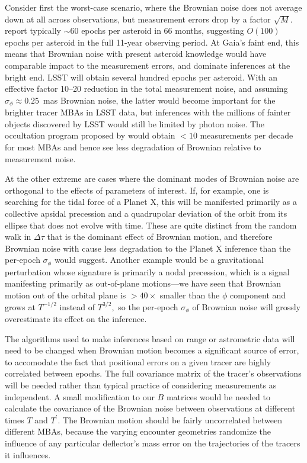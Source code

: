 \documentclass[linenumbers, onecolumn]{aastex631}
\newcommand{\matB}{B}
\begin{document}
Consider first the worst-case scenario, where the Brownian noise does
not average down at all across observations, but measurement errors
drop by a factor $\sqrt{M}.$   \citet{gaiafpr} report typically $\sim60$ epochs per asteroid in 66 months, suggesting $O(100)$ epochs per asteroid in the full 11-year observing period.  At Gaia's faint end, this means that Brownian noise with present asteroid knowledge would have comparable impact to the measurement errors, and dominate inferences at the bright end.  LSST will obtain several hundred epochs per asteroid.  With an effective factor 10--20 reduction in the total measurement noise, and assuming $\sigma_\phi\approx0.25$~mas Brownian noise, the latter would become important for the brighter tracer MBAs in LSST data, but inferences with the millions of fainter objects discovered by LSST would still be limited by photon noise.  The occultation program proposed by \citet{occultations} would obtain $<10$ measurements per decade for most MBAs and hence see less degradation of Brownian relative to measurement noise.

At the other extreme are cases where the dominant modes of Brownian noise are orthogonal to the effects of parameters of interest.  
If, for example, one is searching for the tidal force of a Planet X, this will be manifested primarily as a collective apsidal precession and a quadrupolar deviation of the orbit from its ellipse that does not evolve with time.  These are quite distinct from the random walk in $\Delta\tau$ that is the dominant effect of Brownian motion, and therefore Brownian noise with cause less degradation to the Planet X inference than the per-epoch $\sigma_\phi$ would suggest.  Another example would be a gravitational perturbation whose signature is primarily a nodal precession, which is a signal manifesting primarily as out-of-plane motions---we have seen that Brownian motion out of the orbital plane is $>40\times$ smaller than the $\phi$ component and grows at $T^{-1/2}$ instead of $T^{3/2},$ so the per-epoch $\sigma_\phi$ of Brownian noise will grossly overestimate its effect on the inference.

The algorithms used to make inferences based on range or astrometric
data will need to be changed when Brownian motion becomes a
significant source of error, to accomodate the fact that positional
errors on a given tracer are highly correlated between epochs.  The
full covariance matrix of the tracer's observations will be needed
rather than typical practice of considering measurements as
independent.  A small modification to our $\matB$ matrices would be
needed to calculate the covariance of the Brownian noise between
observations at different times $T$ and $T^\prime.$  The Brownian
motion should be fairly uncorrelated between different MBAs, because
the varying encounter geometries randomize the influence of any
particular deflector's mass error on the trajectories of the tracers
it influences.
\end{document}

